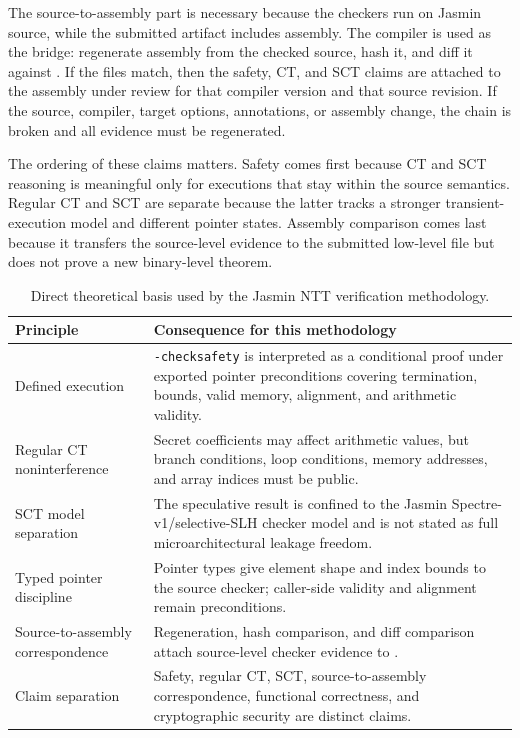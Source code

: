 \documentclass[10pt,twocolumn]{article}
\begin{document}
The source-to-assembly part is necessary because the checkers run on Jasmin
source, while the submitted artifact includes assembly.  The compiler is used
as the bridge: regenerate assembly from the checked source, hash it, and diff it
against .  If the files match, then the safety, CT, and SCT
claims are attached to the assembly under review for that compiler version and
that source revision.  If the source, compiler, target options, annotations, or
assembly change, the chain is broken and all evidence must be regenerated.

The ordering of these claims matters.  Safety comes first because CT and SCT
reasoning is meaningful only for executions that stay within the source
semantics.  Regular CT and SCT are separate because the latter tracks a
stronger transient-execution model and different pointer states.  Assembly
comparison comes last because it transfers the source-level evidence to the
submitted low-level file but does not prove a new binary-level theorem.

\begin{table}[t]
\centering
\scriptsize
\setlength{\tabcolsep}{3pt}
\begin{tabular}{P{0.34\columnwidth}P{0.56\columnwidth}}
\toprule
Principle & Consequence for this methodology \tabularnewline
\midrule
Defined execution & \texttt{-checksafety} is interpreted as a conditional proof
under exported pointer preconditions covering termination, bounds, valid memory,
alignment, and arithmetic validity. \tabularnewline
Regular CT noninterference & Secret coefficients may affect arithmetic values,
but branch conditions, loop conditions, memory addresses, and array indices must
be public. \tabularnewline
SCT model separation & The speculative result is confined to the Jasmin
Spectre-v1/selective-SLH checker model and is not stated as full
microarchitectural leakage freedom. \tabularnewline
Typed pointer discipline & Pointer types give element shape and index bounds to
the source checker; caller-side validity and alignment remain preconditions.
\tabularnewline
Source-to-assembly correspondence & Regeneration, hash comparison, and diff
comparison attach source-level checker evidence to . \tabularnewline
Claim separation & Safety, regular CT, SCT, source-to-assembly correspondence,
functional correctness, and cryptographic security are distinct claims.
\tabularnewline
\bottomrule
\end{tabular}
\caption{Direct theoretical basis used by the Jasmin NTT verification
methodology.}
\label{tab:method-theory-basis}
\end{table}
\end{document}
